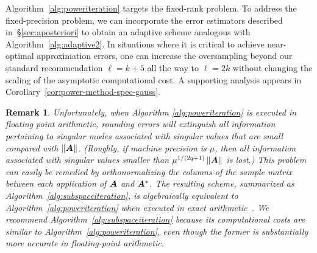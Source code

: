 \documentclass[final]{siamltex}
\newcommand{\pgnotate}[1]{{\color{blue}[#1]}}
\newtheorem{remark}{Remark}[section]
\begin{document}
Algorithm~\ref{alg:poweriteration} targets the fixed-rank problem.  To address the fixed-precision
problem, we can incorporate the error estimators described in~\S\ref{sec:aposteriori}
to obtain an adaptive scheme analogous with Algorithm~\ref{alg:adaptive2}.
In situations where it is critical to achieve near-optimal approximation errors,
one can increase the oversampling beyond our standard recommendation
$\ell = k + 5$ all the way to $\ell = 2k$ without changing the
scaling of the asymptotic computational cost.  %
A supporting analysis appears
in Corollary~\ref{cor:power-method-spec-gauss}.

\lsp

\begin{remark} \rm
\label{remark:roundoff_in_powerscheme}
Unfortunately, when Algorithm \ref{alg:poweriteration} is executed in floating point arithmetic,
rounding errors will extinguish all information pertaining to singular modes associated with
singular values that are small compared with $\left\Vert {\bm{A}} \right\Vert$. (Roughly, if machine
precision is $\mu$, then all information associated with singular values smaller than
$\mu^{1/(2q+1)} \left\Vert {\bm{A}} \right\Vert$ is lost.) This problem can easily be remedied
by orthonormalizing
the columns of the sample matrix between each application of $\bm{A}$ and $\bm{A}^{*}$.
The resulting scheme, summarized as Algorithm~\ref{alg:subspaceiteration}, is algebraically
equivalent to Algorithm~\ref{alg:poweriteration} when executed in exact arithmetic~\cite{stewart1969,Szlam10}.
We recommend Algorithm~\ref{alg:subspaceiteration} because its computational costs are similar to
Algorithm~\ref{alg:poweriteration}, even though the former is substantially more accurate in
floating-point arithmetic.

\end{remark}

\lsp
\end{document}
